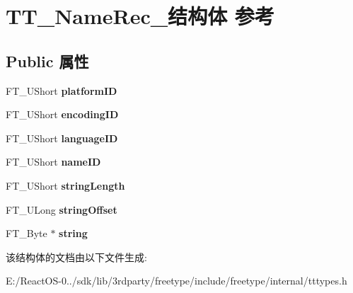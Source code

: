 \hypertarget{struct_t_t___name_rec__}{}\section{T\+T\+\_\+\+Name\+Rec\+\_\+结构体 参考}
\label{struct_t_t___name_rec__}
\subsection*{Public 属性}
\begin{DoxyCompactItemize}
\item 
\mbox{\label{struct_t_t___name_rec___af901d27c076646df9be97ec91a996c69}} 
F\+T\+\_\+\+U\+Short {\bfseries platform\+ID}
\item 
\mbox{\label{struct_t_t___name_rec___ae6c4c5b98dd5b8057dd04d5d69e5341c}} 
F\+T\+\_\+\+U\+Short {\bfseries encoding\+ID}
\item 
\mbox{\label{struct_t_t___name_rec___ac86e9423a14b5cfc5bd1b85e60f099d3}} 
F\+T\+\_\+\+U\+Short {\bfseries language\+ID}
\item 
\mbox{\label{struct_t_t___name_rec___afc1937aed86ed4a1b55eed3508b81113}} 
F\+T\+\_\+\+U\+Short {\bfseries name\+ID}
\item 
\mbox{\label{struct_t_t___name_rec___adacd09126dee6b93c80f7c97a556767e}} 
F\+T\+\_\+\+U\+Short {\bfseries string\+Length}
\item 
\mbox{\label{struct_t_t___name_rec___a62a5f99b65df42df05704573ac64ed8e}} 
F\+T\+\_\+\+U\+Long {\bfseries string\+Offset}
\item 
\mbox{\label{struct_t_t___name_rec___a767d23b850e10ec03009fb4413ac8740}} 
F\+T\+\_\+\+Byte $\ast$ {\bfseries string}
\end{DoxyCompactItemize}


该结构体的文档由以下文件生成\+:\begin{DoxyCompactItemize}
\item 
E\+:/\+React\+O\+S-\/0../sdk/lib/3rdparty/freetype/include/freetype/internal/tttypes.\+h\end{DoxyCompactItemize}
